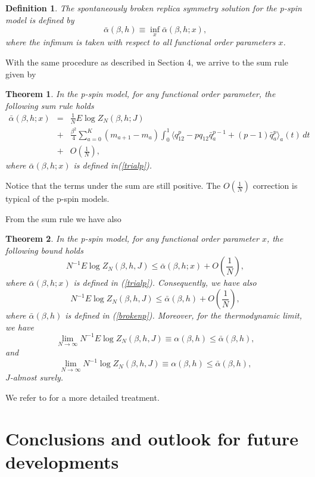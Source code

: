 \documentclass[a4paper,12pt]{article}
\newcommand{\med}[1]{\langle #1 \rangle}
\newtheorem{theorem}{Theorem}
\newtheorem{definition}{Definition}
\begin{document}
\begin{definition}
The  spontaneously broken replica symmetry solution for the p-spin model 
is defined by
\begin{equation}\label{brokenp}
\bar\alpha(\beta,h)\equiv \inf_x \bar\alpha(\beta,h;x),
\end{equation}
where the infimum is taken with respect to all functional order parameters 
$x$. 
\end{definition}

With the same procedure as described in Section 4, we arrive to the sum 
rule given by
\begin{theorem}
\label{tsump}
In the p-spin model, for any functional order parameter, 
the following sum rule holds
\begin{eqnarray}
\nonumber
\bar\alpha(\beta,h;x)&=&\frac{1}{N}E\log Z_{N}(\beta,h;J)\\
\nonumber
&+&
\frac{\beta^2}{4} \sum_{a=0}^{K}(m_{a+1}-m_a)
\int_{0}^{1}\med{q_{12}^{p}- p q_{12}{\bar q}_{a}^{p-1}+
(p-1) {\bar q}_{a}^{p}}_{a}(t)\,dt\\
\label{sump}
&+&O(\frac1N),
\end{eqnarray}
where $\bar\alpha(\beta,h;x)$ is defined in(\ref{trialp}). 
\end{theorem}

Notice that the terms under the sum are still positive. The $O(\frac1N)$ 
correction is typical of the p-spin models.

From the sum rule we have also
\begin{theorem}
\label{mainp}
In the p-spin model, for any functional order parameter $x$, the 
following bound holds
$$
N^{-1}E\log Z_{N}(\beta,h,J)\le\bar\alpha(\beta,h;x)+O(\frac1N),
$$
where $\bar\alpha(\beta,h;x)$ is defined in 
(\ref{trialp}). Consequently, we have also
$$
N^{-1}E\log Z_{N}(\beta,h,J)\le\bar\alpha(\beta,h)+O(\frac1N),
$$
where $\bar\alpha(\beta,h)$ is defined in 
(\ref{brokenp}). Moreover, for the thermodynamic limit, we have
$$
\lim_{N\to\infty}N^{-1}E\log Z_{N}(\beta,h,J)\equiv\alpha(\beta,h)\le
\bar\alpha(\beta,h),
$$
and
$$
\lim_{N\to\infty}N^{-1}\log Z_{N}(\beta,h,J)\equiv\alpha(\beta,h)\le
\bar\alpha(\beta,h),
$$
$J$-almost surely.
\end{theorem}

We refer to \cite{GTpspin} for a more detailed treatment.

\section{Conclusions and outlook for future developments}
\end{document}
